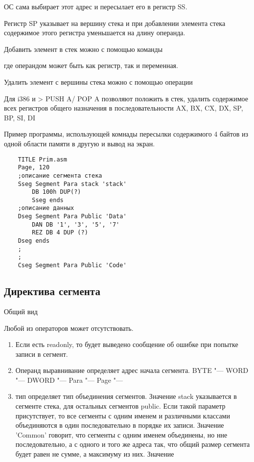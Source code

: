 ОС сама выбирает этот адрес и пересылает его в регистр SS.

Регистр SP указывает на вершину стека и при добавлении элемента стека содержимое этого регистра уменьшается на длину операнда. 

Добавить элемент в стек можно с помощью команды

где операндом может быть как регистр, так и переменная.

Удалить элемент с вершины стека можно с помощью операции


Для i386 и > PUSH A/ POP A позволяют положить в стек, удалить содержимое всех регистров общего назначения в последовательности AX, BX, CX, DX, SP, BP, SI, DI



Пример программы, использующей комнады пересылки содержимого 4 байтов из одной области памяти в другую и вывод на экран.
\begin{verbatim}
    TITLE Prim.asm
    Page, 120
    ;описание сегмента стека
    Sseg Segment Para stack 'stack'
        DB 100h DUP(?)
        Sseg ends
    ;описание данных
    Dseg Segment Para Public 'Data'
        DAN DB '1', '3', '5', '7'
        REZ DB 4 DUP (?)
    Dseg ends
    ;
    ;
    Cseg Segment Para Public 'Code'
\end{verbatim}

\subsection{Директива сегмента}
Общий вид

Любой из операторов может отсутствовать.
\begin{enumerate}
    \item Если есть readonly, то будет выведено сообщение об ошибке при попытке записи в сегмент.
    \item Операнд выравнивание определяет адрес начала сегмента.
    BYTE "---
    WORD "---
    DWORD "---
    Para "---
    Page "---
    \item тип определяет тип объединения сегментов.
    Значение stack указывается в сегменте стека, для остальных сегментов public. Если такой параметр присутствует, то все сегменты с одним именем и различными классами объединяются в один  последовательно в порядке их записи.
    Значение 'Common' говорит, что сегменты с одним именем объединены, но нне последовательно, а с одного и того же адреса так, что общий размер сегмента будет равен не сумме, а максимуму из них.
    Значение
\end{enumerate}

